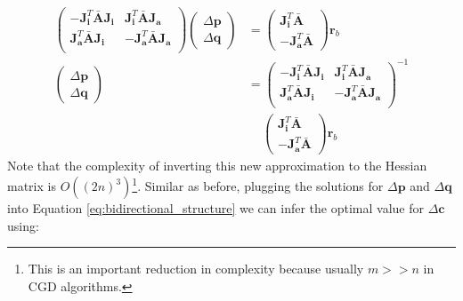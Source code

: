 \begin{equation}
    \begin{aligned}
        \begin{pmatrix}
            -\mathbf{J}_{\mathbf{i}}^T \bar{\mathbf{A}}\mathbf{J}_{\mathbf{i}} & \mathbf{J}_{\mathbf{i}}^T \bar{\mathbf{A}}\mathbf{J}_{\mathbf{a}}
            \\
            \mathbf{J}_{\mathbf{a}}^T \bar{\mathbf{A}}\mathbf{J}_{\mathbf{i}} & -\mathbf{J}_{\mathbf{a}}^T \bar{\mathbf{A}}\mathbf{J}_{\mathbf{a}}
            \\
        \end{pmatrix}
        \begin{pmatrix}
            \Delta\mathbf{p}
            \\
            \Delta\mathbf{q}
        \end{pmatrix} & =
        \begin{pmatrix}
            \mathbf{J}_{\mathbf{i}}^T\bar{\mathbf{A}}
            \\
            -\mathbf{J}_{\mathbf{a}}^T\bar{\mathbf{A}}
        \end{pmatrix} \mathbf{r}_b
       \\
       \begin{pmatrix}
            \Delta\mathbf{p}
            \\
            \Delta\mathbf{q}
        \end{pmatrix} & =
        \begin{pmatrix}
            -\mathbf{J}_{\mathbf{i}}^T \bar{\mathbf{A}}\mathbf{J}_{\mathbf{i}} & \mathbf{J}_{\mathbf{i}}^T \bar{\mathbf{A}}\mathbf{J}_{\mathbf{a}}
            \\
            \mathbf{J}_{\mathbf{a}}^T \bar{\mathbf{A}}\mathbf{J}_{\mathbf{i}} & -\mathbf{J}_{\mathbf{a}}^T \bar{\mathbf{A}}\mathbf{J}_{\mathbf{a}}
            \\
        \end{pmatrix}^{-1}
        \\
        & \quad \,
        \begin{pmatrix}
            \mathbf{J}_{\mathbf{i}}^T\bar{\mathbf{A}}
            \\
            -\mathbf{J}_{\mathbf{a}}^T\bar{\mathbf{A}}
        \end{pmatrix} \mathbf{r}_b
    \label{eq:bidirectional_schur_solution1}
    \end{aligned}
\end{equation}
Note that the complexity of inverting this new approximation to the Hessian matrix is $O((2n)^3)$\footnote{This is an important reduction in complexity because usually $m >> n$ in CGD algorithms.}. Similar as before, plugging the solutions for $\Delta\mathbf{p}$ and $\Delta\mathbf{q}$ into Equation \ref{eq:bidirectional_structure} we can infer the optimal value for $\Delta\mathbf{c}$ using:
